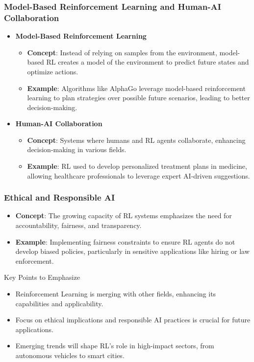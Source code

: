 \documentclass[aspectratio=169]{beamer}
\begin{document}
\begin{frame}[fragile]
    \frametitle{Model-Based Reinforcement Learning and Human-AI Collaboration}
    \begin{itemize}
        \item \textbf{Model-Based Reinforcement Learning}
            \begin{itemize}
                \item \textbf{Concept}: Instead of relying on samples from the environment, model-based RL creates a model of the environment to predict future states and optimize actions.
                \item \textbf{Example}: Algorithms like AlphaGo leverage model-based reinforcement learning to plan strategies over possible future scenarios, leading to better decision-making.
            \end{itemize}
        
        \item \textbf{Human-AI Collaboration}
            \begin{itemize}
                \item \textbf{Concept}: Systems where humans and RL agents collaborate, enhancing decision-making in various fields.
                \item \textbf{Example}: RL used to develop personalized treatment plans in medicine, allowing healthcare professionals to leverage expert AI-driven suggestions.
            \end{itemize}
    \end{itemize}
\end{frame}

\begin{frame}[fragile]
    \frametitle{Ethical and Responsible AI}
    \begin{itemize}
        \item \textbf{Concept}: The growing capacity of RL systems emphasizes the need for accountability, fairness, and transparency.
        \item \textbf{Example}: Implementing fairness constraints to ensure RL agents do not develop biased policies, particularly in sensitive applications like hiring or law enforcement.
    \end{itemize}
    \begin{block}{Key Points to Emphasize}
        \begin{itemize}
            \item Reinforcement Learning is merging with other fields, enhancing its capabilities and applicability.
            \item Focus on ethical implications and responsible AI practices is crucial for future applications.
            \item Emerging trends will shape RL's role in high-impact sectors, from autonomous vehicles to smart cities.
        \end{itemize}
    \end{block}
\end{frame}
\end{document}
